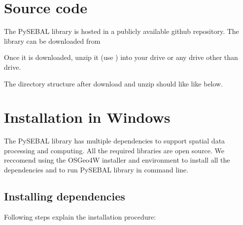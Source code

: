 \documentclass[letterpaper,10pt,english]{sphinxmanual}
\let\sphinxpxdimen\pdfpxdimen\else\newdimen\sphinxpxdimen
\begin{document}
\section{Source code}
\label{\detokenize{installation:source-code}}
The PySEBAL library is hosted in a publicly available github repository. The library can be downloaded from 

\begin{figure}[htbp]
\centering

\noindent\sphinxincludegraphics[width=400\sphinxpxdimen]{{git1}.png}
\end{figure}

\begin{DUlineblock}{0em}
\item[] Once it is downloaded, unzip it (use ) into your  drive or any drive other than  drive.
\end{DUlineblock}

\begin{DUlineblock}{0em}
\item[] The directory structure after download and unzip should like like below.
\end{DUlineblock}

\begin{figure}[htbp]
\centering

\noindent\sphinxincludegraphics[width=400\sphinxpxdimen]{{git2}.png}
\end{figure}


\section{Installation in Windows}
\label{\detokenize{installation:installation-in-windows}}
The PySEBAL library has multiple dependencies to support spatial data processing and computing. All the required libraries are open source. We reccomend using the OSGeo4W installer and environment to install all the dependencies and to run PySEBAL library in command line.


\subsection{Installing dependencies}
\label{\detokenize{installation:installing-dependencies}}
\begin{DUlineblock}{0em}
\item[] Following steps explain the installation procedure:
\item[] 
\end{DUlineblock}
\end{document}
